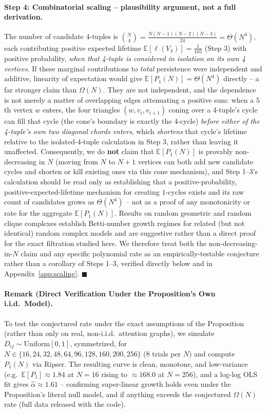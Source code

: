 \documentclass{article}
\begin{document}
\paragraph{Step 4: Combinatorial scaling -- plausibility argument, not a full derivation.}
The number of candidate 4-tuples is $\binom{N}{4} = \frac{N(N-1)(N-2)(N-3)}{24} = \Theta(N^4)$, each contributing positive expected lifetime $\mathbb{E}[\ell(V_4)] = \frac{1}{105}$ (Step 3) with positive probability, \emph{when that 4-tuple is considered in isolation on its own 4 vertices}. If these marginal contributions to \emph{total} persistence were independent and additive, linearity of expectation would give $\mathbb{E}[P_1(N)] = \Theta(N^4)$ directly -- a far stronger claim than $\Omega(N)$. They are not independent, and the dependence is not merely a matter of overlapping edges attenuating a positive sum: when a $5$th vertex $w$ enters, the four triangles $(w,v_i,v_{i+1})$ coning over a 4-tuple's cycle can fill that cycle (the cone's boundary is exactly the 4-cycle) \emph{before either of the 4-tuple's own two diagonal chords enters}, which \emph{shortens} that cycle's lifetime relative to the isolated-4-tuple calculation in Step 3, rather than leaving it unaffected. Consequently, we do \textbf{not} claim that $\mathbb{E}[P_1(N)]$ is provably non-decreasing in $N$ (moving from $N$ to $N{+}1$ vertices can both add new candidate cycles and shorten or kill existing ones via this cone mechanism), and Step 1--3's calculation should be read only as establishing that a positive-probability, positive-expected-lifetime mechanism for creating $1$-cycles exists and its raw count of candidates grows as $\Theta(N^4)$ -- not as a proof of any monotonicity or rate for the aggregate $\mathbb{E}[P_1(N)]$. Results on random geometric and random clique complexes \citep{kahle2011, bobrowski2018} establish Betti-number growth regimes for related (but not identical) random complex models and are suggestive rather than a direct proof for the exact filtration studied here. We therefore treat both the non-decreasing-in-$N$ claim and any specific polynomial rate as an empirically-testable conjecture rather than a corollary of Steps 1--3, verified directly below and in Appendix~\ref{app:scaling}. $\blacksquare$

\paragraph{Remark (Direct Verification Under the Proposition's Own i.i.d.\ Model).}
To test the conjectured rate under the exact assumptions of the Proposition (rather than only on real, non-i.i.d.\ attention graphs), we simulate $D_{ij} \sim \mathrm{Uniform}[0,1]$, symmetrized, for $N \in \{16, 24, 32, 48, 64, 96, 128, 160, 200, 256\}$ ($8$ trials per $N$) and compute $P_1(N)$ via Ripser. The resulting curve is clean, monotone, and low-variance (e.g.\ $\mathbb{E}[P_1] \approx 1.84$ at $N{=}16$ rising to $\approx 168.0$ at $N{=}256$), and a log-log OLS fit gives $\hat\alpha \approx 1.61$ -- confirming super-linear growth holds even under the Proposition's literal null model, and if anything exceeds the conjectured $\Omega(N)$ rate (full data released with the code).
\end{document}
